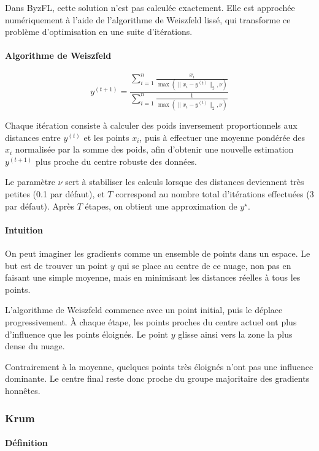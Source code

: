 \documentclass[a4paper,11pt]{article}
\begin{document}
Dans ByzFL, cette solution n'est pas calculée exactement. Elle est approchée numériquement à l'aide de l'algorithme de Weiszfeld lissé, qui transforme ce problème d'optimisation en une suite d'itérations.

\paragraph{Algorithme de Weiszfeld}

\[
y^{(t+1)} =
\frac{\sum_{i=1}^{n} \frac{x_i}{\max(\|x_i - y^{(t)}\|_2,\nu)}}
{\sum_{i=1}^{n} \frac{1}{\max(\|x_i - y^{(t)}\|_2,\nu)}}
\]

Chaque itération consiste à calculer des poids inversement proportionnels aux distances entre $y^{(t)}$ et les points $x_i$, puis à effectuer une moyenne pondérée des $x_i$ normalisée par la somme des poids, afin d'obtenir une nouvelle estimation $y^{(t+1)}$ plus proche du centre robuste des données.

Le paramètre $\nu$ sert à stabiliser les calculs lorsque des distances deviennent très petites (0.1 par défaut), et $T$ correspond au nombre total d'itérations effectuées (3 par défaut). Après $T$ étapes, on obtient une approximation de $y^\star$.

\paragraph{Intuition}

On peut imaginer les gradients comme un ensemble de points dans un espace. Le but est de trouver un point $y$ qui se place au centre de ce nuage, non pas en faisant une simple moyenne, mais en minimisant les distances réelles à tous les points.

L'algorithme de Weiszfeld commence avec un point initial, puis le déplace progressivement. À chaque étape, les points proches du centre actuel ont plus d'influence que les points éloignés. Le point $y$ glisse ainsi vers la zone la plus dense du nuage.

Contrairement à la moyenne, quelques points très éloignés n'ont pas une influence dominante. Le centre final reste donc proche du groupe majoritaire des gradients honnêtes.


\subsubsection{Krum}

\paragraph{Définition}
\end{document}
